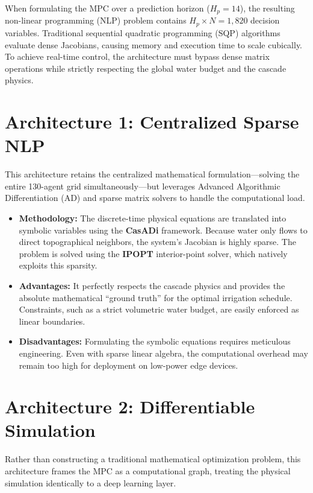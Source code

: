 \documentclass[12pt, a4paper]{article}
\begin{document}
When formulating the MPC over a prediction horizon ($H_p = 14$), the resulting non-linear programming (NLP) problem contains $H_p \times N = 1,820$ decision variables. Traditional sequential quadratic programming (SQP) algorithms evaluate dense Jacobians, causing memory and execution time to scale cubically. To achieve real-time control, the architecture must bypass dense matrix operations while strictly respecting the global water budget and the cascade physics.

\section{Architecture 1: Centralized Sparse NLP}
\label{sec:casadi}
This architecture retains the centralized mathematical formulation—solving the entire 130-agent grid simultaneously—but leverages Advanced Algorithmic Differentiation (AD) and sparse matrix solvers to handle the computational load.

\begin{itemize}
    \item \textbf{Methodology:} The discrete-time physical equations are translated into symbolic variables using the \textbf{CasADi} framework. Because water only flows to direct topographical neighbors, the system's Jacobian is highly sparse. The problem is solved using the \textbf{IPOPT} interior-point solver, which natively exploits this sparsity.
    \item \textbf{Advantages:} It perfectly respects the cascade physics and provides the absolute mathematical ``ground truth'' for the optimal irrigation schedule. Constraints, such as a strict volumetric water budget, are easily enforced as linear boundaries.
    \item \textbf{Disadvantages:} Formulating the symbolic equations requires meticulous engineering. Even with sparse linear algebra, the computational overhead may remain too high for deployment on low-power edge devices.
\end{itemize}

\section{Architecture 2: Differentiable Simulation}
\label{sec:jax}
Rather than constructing a traditional mathematical optimization problem, this architecture frames the MPC as a computational graph, treating the physical simulation identically to a deep learning layer.
\end{document}
